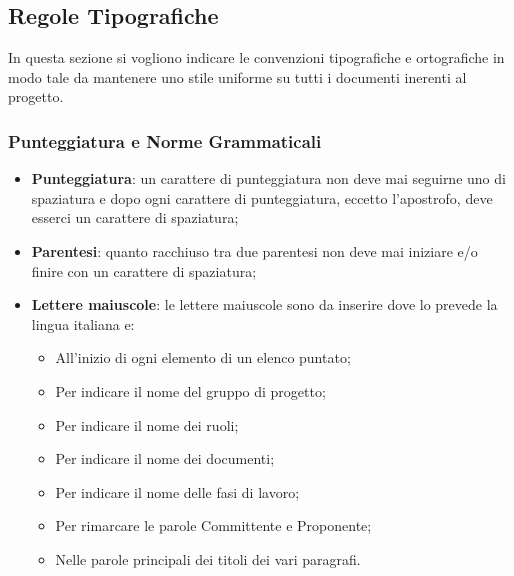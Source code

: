 \subsection{Regole Tipografiche}
In questa sezione si vogliono indicare le convenzioni tipografiche e ortografiche in modo tale da mantenere uno stile uniforme su tutti i documenti inerenti al progetto.

\subsubsection{Punteggiatura e Norme Grammaticali}

\begin{itemize}
\item \textbf{Punteggiatura}: un carattere di punteggiatura non deve mai seguirne uno di spaziatura e dopo ogni carattere di punteggiatura, eccetto l'apostrofo, deve esserci un carattere di spaziatura;
\item \textbf{Parentesi}: quanto racchiuso tra due parentesi non deve mai iniziare e/o finire con un carattere di spaziatura;
\item \textbf{Lettere maiuscole}: le lettere maiuscole sono da inserire dove lo prevede la lingua italiana e:
\begin{itemize}
\item All'inizio di ogni elemento di un elenco puntato;
\item Per indicare il nome del gruppo di progetto;
\item Per indicare il nome dei ruoli;
\item Per indicare il nome dei documenti;
\item Per indicare il nome delle fasi di lavoro;
\item Per rimarcare le parole Committente e Proponente;
\item Nelle parole principali dei titoli dei vari paragrafi.
\end{itemize}
\end{itemize}

